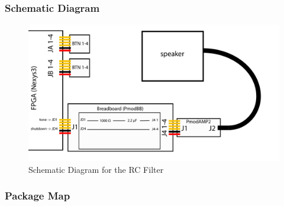 \documentclass{article}
\begin{document}
    \subsubsection{Schematic Diagram}

      \begin{figure}[H]
        \centering
        \includegraphics[width=6.25in]{img/RCschematic}
        \caption{Schematic Diagram for the RC Filter}
      \end{figure}

    \newpage
    \subsubsection{Package Map}

\end{document}

